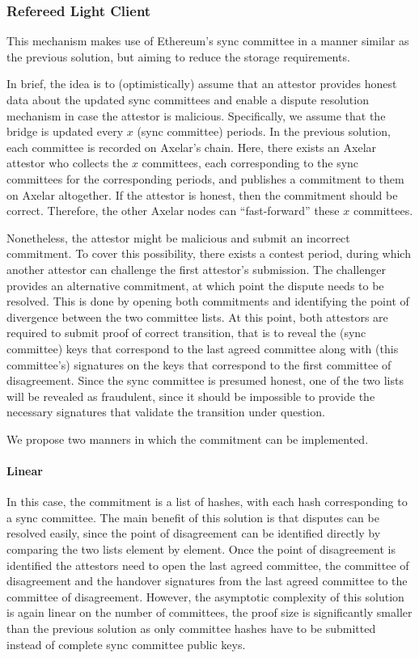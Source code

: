 \subsubsection{Refereed Light Client}

This mechanism makes use of Ethereum's sync committee in a manner similar as
the previous solution, but aiming to reduce the storage requirements. 

In brief, the idea is to (optimistically) assume that an attestor provides
honest data about the updated sync committees and enable a dispute resolution
mechanism in case the attestor is malicious\cite{agrawal2023proofs}. Specifically, we assume that the
bridge is updated every $x$ (sync committee) periods. In the previous
solution, each committee is recorded on Axelar's chain. Here, there exists an
Axelar attestor who collects the $x$ committees, each corresponding to the sync
committees for the corresponding periods, and publishes a commitment to them on
Axelar altogether. If the attestor is honest, then the commitment should be
correct.  Therefore, the other Axelar nodes can ``fast-forward'' these $x$
committees.

Nonetheless, the attestor might be malicious and submit an incorrect
commitment. To cover this possibility, there exists a contest period, during
which another attestor can challenge the first attestor's submission. The
challenger provides an alternative commitment, at which point the dispute needs
to be resolved. This is done by opening both commitments and identifying the
point of divergence between the two committee lists. At this point, both
attestors are required to submit proof of correct transition, that is to reveal
the (sync committee) keys that correspond to the last agreed committee along
with (this committee's) signatures on the keys that correspond to the first
committee of disagreement. Since the sync committee is presumed honest, one of
the two lists will be revealed as fraudulent, since it should be impossible to
provide the necessary signatures that validate the transition under question.

We propose two manners in which the commitment can be implemented.

\paragraph{Linear}
In this case, the commitment is a list of hashes, with each hash corresponding
to a sync committee. The main benefit of this solution is that disputes can be
resolved easily, since the point of disagreement can be identified directly by
comparing the two lists element by element. Once the point of disagreement 
is identified the attestors need to open the last agreed committee, the committee 
of disagreement and the handover signatures from the last agreed committee to the
committee of disagreement.
However, the asymptotic complexity 
of this solution is again linear on the number of committees, 
the proof size is significantly smaller than the previous solution as only committee hashes 
have to be submitted instead of complete sync committee public keys.

